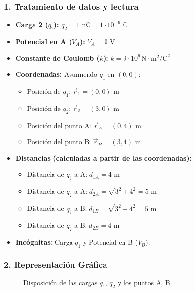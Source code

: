\subsubsection*{1. Tratamiento de datos y lectura}
\begin{itemize}
    \item \textbf{Carga 2 ($q_2$):} $q_2 = 1 \text{ nC} = 1 \cdot 10^{-9} \text{ C}$
    \item \textbf{Potencial en A ($V_A$):} $V_A = 0 \text{ V}$
    \item \textbf{Constante de Coulomb ($k$):} $k = 9 \cdot 10^9 \, \text{N}\cdot\text{m}^2/\text{C}^2$
    \item \textbf{Coordenadas:} Asumiendo $q_1$ en $(0,0)$:
        \begin{itemize}
            \item Posición de $q_1$: $\vec{r}_1 = (0,0)$ m
            \item Posición de $q_2$: $\vec{r}_2 = (3,0)$ m
            \item Posición del punto A: $\vec{r}_A = (0,4)$ m
            \item Posición del punto B: $\vec{r}_B = (3,4)$ m
        \end{itemize}
    \item \textbf{Distancias (calculadas a partir de las coordenadas):}
        \begin{itemize}
            \item Distancia de $q_1$ a A: $d_{1A} = 4 \text{ m}$
            \item Distancia de $q_2$ a A: $d_{2A} = \sqrt{3^2 + 4^2} = 5 \text{ m}$
            \item Distancia de $q_1$ a B: $d_{1B} = \sqrt{3^2 + 4^2} = 5 \text{ m}$
            \item Distancia de $q_2$ a B: $d_{2B} = 4 \text{ m}$
        \end{itemize}
    \item \textbf{Incógnitas:} Carga $q_1$ y Potencial en B ($V_B$).
\end{itemize}

\subsubsection*{2. Representación Gráfica}
\begin{figure}[H]
    \centering
    \caption{Disposición de las cargas $q_1$, $q_2$ y los puntos A, B.}
\end{figure}

